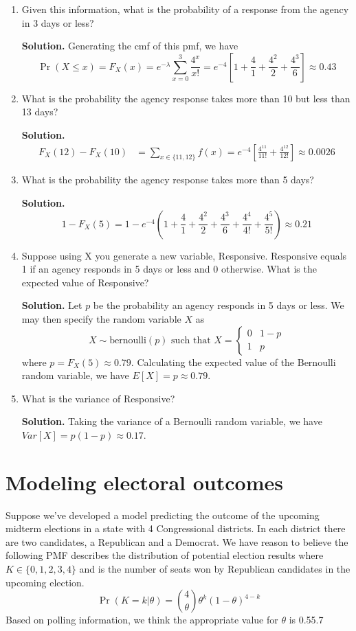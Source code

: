 \documentclass[12pt]{article}
\begin{document}
\begin{enumerate}
    \item Given this information, what is the probability of a response from the agency in 3 days or less?

    \textbf{Solution.}
    Generating the cmf of this pmf, we have
    \[ \Pr(X\leq x) = F_X(x) = e^{-\lambda} \sum_{x=0}^3 \frac{4^x}{x!} = e^{-4}\left[ 1+\frac{4}{1} +\frac{4^2}{2}+\frac{4^3}{6}\right]\approx0.43 \]
    
    \item What is the probability the agency response takes more than 10 but less than 13 days?

    \textbf{Solution.}
    \begin{align*}
        F_X(12)-F_X(10) &= \sum_{x\in\{11,12\}}f(x)= e^{-4}\left[ \frac{4^{11}}{11!}+\frac{4^{12}}{12!}\right]\approx 0.0026
    \end{align*}
    \item What is the probability the agency response takes more than 5 days?
    
    \textbf{Solution.}
    \[ 1-F_X(5) = 1-e^{-4}\left( 1+\frac{4}{1} +\frac{4^2}{2}+\frac{4^3}{6}+\frac{4^4}{4!}+\frac{4^5}{5!}\right)\approx0.21\]

    \item Suppose using X you generate a new variable, Responsive. Responsive equals 1 if an agency responds in 5 days or less and 0 otherwise. What is the expected value of Responsive?
    
    \textbf{Solution.} Let $p$ be the probability an agency responds in 5 days or less. We may then specify the random variable $X$ as 
    \[X\sim \text{bernoulli}(p) \text{ such that } X= \begin{cases}
        0 & 1-p
        \\ 1 & p
    \end{cases}\]
    where $p=F_X(5)\approx 0.79$. Calculating the expected value of the Bernoulli random variable, we have $E[X] = p \approx0.79$.
    
     \item What is the variance of Responsive?
     
     \textbf{Solution.} Taking the variance of a Bernoulli random variable, we have $Var[X] = p(1-p) \approx 0.17$.
\end{enumerate}




\section{Modeling electoral outcomes}
Suppose we’ve developed a model predicting the outcome of the upcoming midterm elections in a state with 4 Congressional districts. In each district there are two candidates, a Republican and a Democrat. We have reason to believe the following PMF describes the distribution of potential election results where $K \in \{0, 1, 2, 3, 4\}$ and is the number of seats won by Republican candidates in the upcoming election.
\[ \Pr(K=k | \theta) = \binom{4}{\theta}\theta^k    (1-\theta)^{4-k}\]
Based on polling information, we think the appropriate value for $\theta$ is 0.55.7
\end{document}
